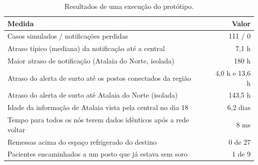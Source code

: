 \documentclass[a4paper,12pt]{article}
\begin{document}
\begin{table}[htbp]
  \centering
  \caption{Resultados de uma execução do protótipo.}
  \label{tab:demo}
  \small
  \begin{tabularx}{\textwidth}{Xr}
    \toprule
    Medida & Valor \\
    \midrule
    Casos simulados / notificações perdidas & 111 / 0 \\
    Atraso típico (mediana) da notificação até a central & 7,1 h \\
    Maior atraso de notificação (Atalaia do Norte, isolada) & 180 h \\
    Atraso do alerta de surto até os postos conectados da região & 4,0 h e 13,6 h \\
    Atraso do alerta de surto até Atalaia do Norte (isolada) & 143,5 h \\
    Idade da informação de Atalaia vista pela central no dia 18 & 6,2 dias \\
    Tempo para todos os nós terem dados idênticos após a rede voltar & 8 ms \\
    Remessas acima do espaço refrigerado do destino & 0 de 27 \\
    Pacientes encaminhados a um posto que já estava sem soro & 1 de 9 \\
    \bottomrule
  \end{tabularx}
\end{table}
\end{document}
